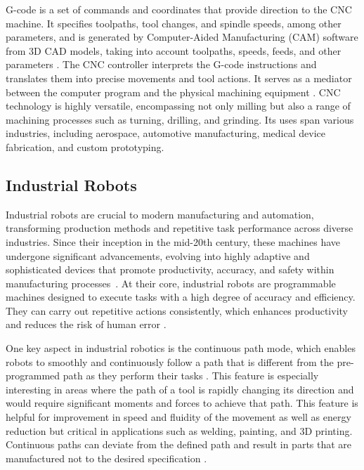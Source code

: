 \documentclass[ZLstudentexpose%
              ,optBiber%
              ,optEnglish%
              ,10pt
              ]{ZLlatex}%
\begin{document}
G-code is a set of commands and coordinates that provide direction to the CNC machine. It specifies toolpaths, tool changes, and spindle speeds, among other parameters, and is generated by Computer-Aided Manufacturing (CAM) software from 3D CAD models, taking into account toolpaths, speeds, feeds, and other parameters \cite{.19072023}.
The CNC controller interprets the G-code instructions and translates them into precise movements and tool actions. It serves as a mediator between the computer program and the physical machining equipment \cite{Adam.2022}. CNC technology is highly versatile, encompassing not only milling but also a range of machining processes such as turning, drilling, and grinding. Its uses span various industries, including aerospace, automotive manufacturing, medical device fabrication, and custom prototyping.%
\subsection{Industrial Robots}
Industrial robots are crucial to modern manufacturing and automation, transforming production methods and repetitive task performance across diverse industries. Since their inception in the mid-20th century, these machines have undergone significant advancements, evolving into highly adaptive and sophisticated devices that promote productivity, accuracy, and safety within manufacturing processes~\cite{Ji.2019}.
At their core, industrial robots are programmable machines designed to execute tasks with a high degree of accuracy and efficiency. They can carry out repetitive actions consistently, which enhances productivity and reduces the risk of human error \cite{Siciliano.2016}. 

One key aspect in industrial robotics is the continuous path mode, which enables robots to smoothly and continuously follow a path that is different from the pre-programmed path as they perform their tasks \cite{Chen.2017}. This feature is especially interesting in areas where the path of a tool is rapidly changing its direction and would require significant moments and forces to achieve that path.
This feature is helpful for improvement in speed and fluidity of the movement as well as energy reduction but critical in applications such as welding, painting, and 3D printing. Continuous paths can deviate from the defined path and result in parts that are manufactured not to the desired specification \cite{Bigliardi.2023}. 
\end{document}
